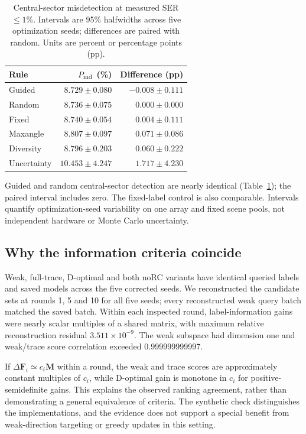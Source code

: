 \documentclass[conference]{IEEEtran}
\newcommand{\F}{\mathbf{F}}
\begin{document}
\begin{table}[t]\centering\small
\caption{Central-sector misdetection at measured SER $\le1\%$. Intervals are 95\% halfwidths across five optimization seeds; differences are paired with random. Units are percent or percentage points (pp).}\label{tab:central}
\begin{tabular}{lrr}\toprule
Rule & $P_{\rm md}$ (\%) & Difference (pp)\\\midrule
Guided & $8.729\pm0.080$ & $-0.008\pm0.111$ \\
Random & $8.736\pm0.075$ & $0.000\pm0.000$ \\
Fixed & $8.740\pm0.054$ & $0.004\pm0.111$ \\
Maxangle & $8.807\pm0.097$ & $0.071\pm0.086$ \\
Diversity & $8.796\pm0.203$ & $0.060\pm0.222$ \\
Uncertainty & $10.453\pm4.247$ & $1.717\pm4.230$ \\
\bottomrule\end{tabular}\end{table}
Guided and random central-sector detection are nearly identical (Table~\ref{tab:central}); the paired interval includes zero. The fixed-label control is also comparable. Intervals quantify optimization-seed variability on one array and fixed scene pools, not independent hardware or Monte Carlo uncertainty.

\subsection{Why the information criteria coincide}
Weak, full-trace, D-optimal and both noRC variants have identical queried labels and saved models across the five corrected seeds. We reconstructed the candidate sets at rounds 1, 5 and 10 for all five seeds; every reconstructed weak query batch matched the saved batch. Within each inspected round, label-information gains were nearly scalar multiples of a shared matrix, with maximum relative reconstruction residual $3.511\times10^{-9}$. The weak subspace had dimension one and weak/trace score correlation exceeded 0.999999999997.

If $\Delta\F_i\simeq c_i\mathbf M$ within a round, the weak and trace scores are approximately constant multiples of $c_i$, while D-optimal gain is monotone in $c_i$ for positive-semidefinite gains. This explains the observed ranking agreement, rather than demonstrating a general equivalence of criteria. The synthetic check distinguishes the implementations, and the evidence does not support a special benefit from weak-direction targeting or greedy updates in this setting.
\end{document}
